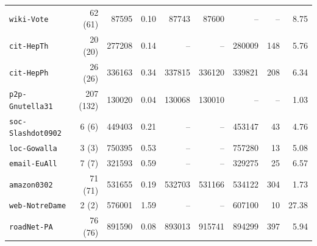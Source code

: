 \begin{tabular}{lrrrrrrrr}
\texttt{wiki-Vote} & 62 (61) & \num{87595} & 0.10 & \num{87743} & \num{87600} & -- & -- & 8.75 \\
\texttt{cit-HepTh} & 20 (20) & \num{277208} & 0.14 & -- & -- & \num{280009} & 148 & 5.76 \\
\texttt{cit-HepPh} & 26 (26) & \num{336163} & 0.34 & \num{337815} & \num{336120} & \num{339821} & 208 & 6.34 \\
\texttt{p2p-Gnutella31} & 207 (132) & \num{130020} & 0.04 & \num{130068} & \num{130010} & -- & -- & 1.03 \\
\texttt{soc-Slashdot0902} & 6 (6) & \num{449403} & 0.21 & -- & -- & \num{453147} & 43 & 4.76 \\
\texttt{loc-Gowalla} & 3 (3) & \num{750395} & 0.53 & -- & -- & \num{757280} & 13 & 5.08 \\
\texttt{email-EuAll} & 7 (7) & \num{321593} & 0.59 & -- & -- & \num{329275} & 25 & 6.57 \\
\texttt{amazon0302} & 71 (71) & \num{531655} & 0.19 & \num{532703} & \num{531166} & \num{534122} & 304 & 1.73 \\
\texttt{web-NotreDame} & 2 (2) & \num{576001} & 1.59 & -- & -- & \num{607100} & 10 & 27.38 \\
\texttt{roadNet-PA} & 76 (76) & \num{891590} & 0.08 & \num{893013} & \num{915741} & \num{894299} & 397 & 5.94 \\
\bottomrule
\end{tabular}
